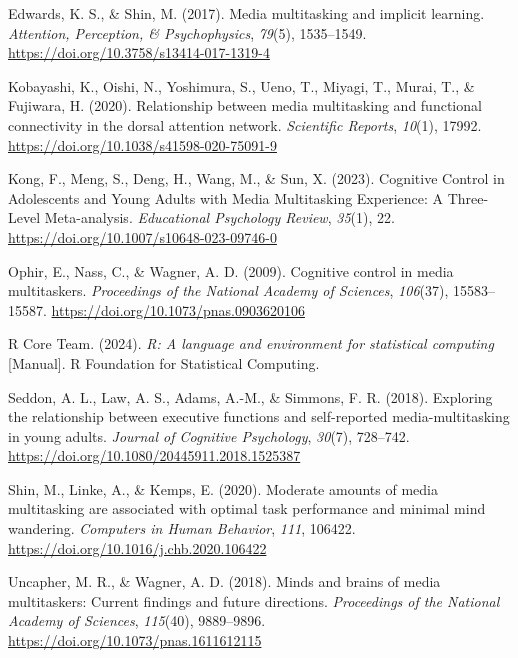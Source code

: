 \documentclass[
  man]{apa7}
\newlength{\cslhangindent}
\newenvironment{CSLReferences}[2] %
 {\begin{list}{}{%
  \setlength{\itemindent}{0pt}
  \setlength{\leftmargin}{0pt}
  \setlength{\parsep}{0pt}
  \ifodd #1
   \setlength{\leftmargin}{\cslhangindent}
   \setlength{\itemindent}{-1\cslhangindent}
  \fi
  \setlength{\itemsep}{#2\baselineskip}}}
 {\end{list}}
\begin{document}
\begin{CSLReferences}{1}{0}
Edwards, K. S., \& Shin, M. (2017). Media multitasking and implicit learning. \emph{Attention, Perception, \& Psychophysics}, \emph{79}(5), 1535--1549. \url{https://doi.org/10.3758/s13414-017-1319-4}

Kobayashi, K., Oishi, N., Yoshimura, S., Ueno, T., Miyagi, T., Murai, T., \& Fujiwara, H. (2020). Relationship between media multitasking and functional connectivity in the dorsal attention network. \emph{Scientific Reports}, \emph{10}(1), 17992. \url{https://doi.org/10.1038/s41598-020-75091-9}

Kong, F., Meng, S., Deng, H., Wang, M., \& Sun, X. (2023). Cognitive {Control} in {Adolescents} and {Young Adults} with {Media Multitasking Experience}: A {Three-Level Meta-analysis}. \emph{Educational Psychology Review}, \emph{35}(1), 22. \url{https://doi.org/10.1007/s10648-023-09746-0}

Ophir, E., Nass, C., \& Wagner, A. D. (2009). Cognitive control in media multitaskers. \emph{Proceedings of the National Academy of Sciences}, \emph{106}(37), 15583--15587. \url{https://doi.org/10.1073/pnas.0903620106}

R Core Team. (2024). \emph{R: A language and environment for statistical computing} {[}Manual{]}. R Foundation for Statistical Computing.

Seddon, A. L., Law, A. S., Adams, A.-M., \& Simmons, F. R. (2018). Exploring the relationship between executive functions and self-reported media-multitasking in young adults. \emph{Journal of Cognitive Psychology}, \emph{30}(7), 728--742. \url{https://doi.org/10.1080/20445911.2018.1525387}

Shin, M., Linke, A., \& Kemps, E. (2020). Moderate amounts of media multitasking are associated with optimal task performance and minimal mind wandering. \emph{Computers in Human Behavior}, \emph{111}, 106422. \url{https://doi.org/10.1016/j.chb.2020.106422}

Uncapher, M. R., \& Wagner, A. D. (2018). Minds and brains of media multitaskers: {Current} findings and future directions. \emph{Proceedings of the National Academy of Sciences}, \emph{115}(40), 9889--9896. \url{https://doi.org/10.1073/pnas.1611612115}


\end{CSLReferences}
\end{document}
